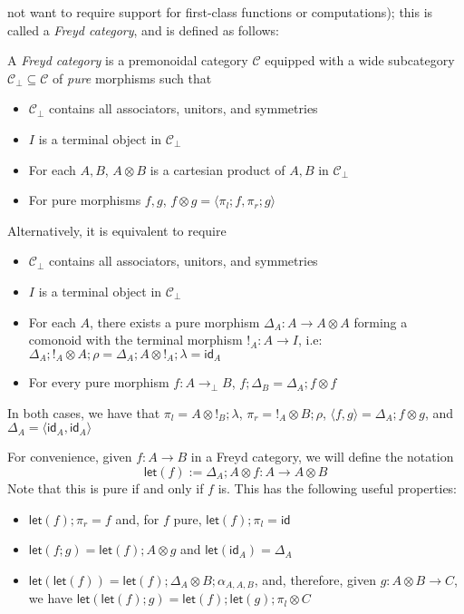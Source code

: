 \documentclass[acmsmall,screen,review]{acmart}
\newcommand{\mc}[1]{\ensuremath{\mathcal{#1}}}
\newcommand{\ms}[1]{\ensuremath{\mathsf{#1}}}
\newcommand{\tmor}[1]{{!}_{#1}}
\newcommand{\dmor}[1]{{\Delta}_{#1}}
\newcommand{\lmor}[1]{\ms{let}(#1)}
\begin{document}
not want to require support for first-class functions or computations); this is called a \emph{Freyd
category}, and is defined as follows:
\begin{definition}
  A \emph{Freyd category} is a premonoidal category $\mc{C}$ equipped with a wide subcategory
  $\mc{C}_\bot \subseteq \mc{C}$ of \emph{pure} morphisms such that
  \begin{itemize}
    \item $\mc{C}_\bot$ contains all associators, unitors, and symmetries
    \item $I$ is a terminal object in $\mc{C}_\bot$
    \item For each $A, B$, $A \otimes B$ is a cartesian product of $A, B$ in $\mc{C}_\bot$
    \item For pure morphisms $f, g$, $f \otimes g = \langle \pi_l; f, \pi_r ; g  \rangle$
  \end{itemize}
  Alternatively, it is equivalent to require
  \begin{itemize}
    \item $\mc{C}_\bot$ contains all associators, unitors, and symmetries
    \item $I$ is a terminal object in $\mc{C}_\bot$
    \item For each $A$, there exists a pure morphism $\dmor{A} : A \to A \otimes A$ forming a
          comonoid with the terminal morphism $\tmor{A} : A \to I$, i.e: $\dmor{A} ; \tmor{A}
          \otimes A ; \rho = \dmor{A} ; A \otimes \tmor {A} ; \lambda = \ms{id}_A$
    \item For every pure morphism $f : A \to_\bot B$, $f ; \dmor{B} = \dmor{A} ; f \otimes f$
  \end{itemize}
  In both cases, we have that $\pi_l = A \otimes \tmor{B} ; \lambda$, $\pi_r = \tmor{A}
  \otimes B ; \rho$, $\langle f, g \rangle = \dmor{A} ; f \otimes g$, and $\dmor{A} = \langle
  \ms{id}_A, \ms{id}_A \rangle$
\end{definition}
For convenience, given $f : A \to B$ in a Freyd category, we will define the notation
\begin{equation}
  \lmor{f} := \dmor{A} ; A \otimes f : A \to A \otimes B
\end{equation}
Note that this is pure if and only if $f$ is. This has the following useful properties:
\begin{itemize}
  \item $\lmor{f} ; \pi_r = f$ and, for $f$ pure, $\lmor{f} ; \pi_l = \ms{id}$
  \item $\lmor{f;g} = \lmor{f} ; A \otimes g$ and $\lmor{\ms{id}_A} = \dmor{A}$
  \item $\lmor{\lmor{f}} = \lmor{f} ; \dmor{A} \otimes B ; \alpha_{A, A, B}$, and, therefore, given
  $g: A \otimes B \to C$, we have $\lmor{\lmor{f};g} = \lmor{f} ; \lmor{g} ; \pi_l \otimes C$
\end{itemize}
\end{document}
